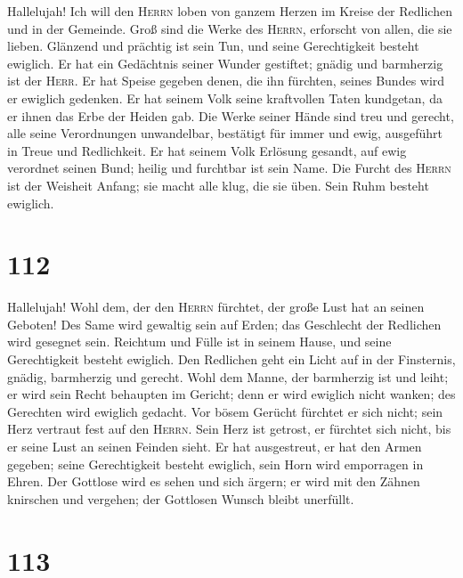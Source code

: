  Hallelujah! Ich will den \textsc{Herrn} loben von ganzem
Herzen im Kreise der Redlichen und in der Gemeinde.  Groß
sind die Werke des \textsc{Herrn}, erforscht von allen, die sie lieben.
 Glänzend und prächtig ist sein Tun, und seine
Gerechtigkeit besteht ewiglich.  Er hat ein Gedächtnis
seiner Wunder gestiftet; gnädig und barmherzig ist der \textsc{Herr}.
 Er hat Speise gegeben denen, die ihn fürchten, seines
Bundes wird er ewiglich gedenken.  Er hat seinem Volk
seine kraftvollen Taten kundgetan, da er ihnen das Erbe der Heiden gab.
 Die Werke seiner Hände sind treu und gerecht, alle seine
Verordnungen unwandelbar,  bestätigt für immer und ewig,
ausgeführt in Treue und Redlichkeit.  Er hat seinem Volk
Erlösung gesandt, auf ewig verordnet seinen Bund; heilig und furchtbar
ist sein Name.  Die Furcht des \textsc{Herrn} ist der
Weisheit Anfang; sie macht alle klug, die sie üben. Sein Ruhm besteht
ewiglich.

\hypertarget{section-111}{%
\section{112}\label{section-111}}

 Hallelujah! Wohl dem, der den \textsc{Herrn} fürchtet,
der große Lust hat an seinen Geboten!  Des Same wird
gewaltig sein auf Erden; das Geschlecht der Redlichen wird gesegnet
sein.  Reichtum und Fülle ist in seinem Hause, und seine
Gerechtigkeit besteht ewiglich.  Den Redlichen geht ein
Licht auf in der Finsternis, gnädig, barmherzig und gerecht.
 Wohl dem Manne, der barmherzig ist und leiht; er wird
sein Recht behaupten im Gericht;  denn er wird ewiglich
nicht wanken; des Gerechten wird ewiglich gedacht.  Vor
bösem Gerücht fürchtet er sich nicht; sein Herz vertraut fest auf den
\textsc{Herrn}.  Sein Herz ist getrost, er fürchtet sich
nicht, bis er seine Lust an seinen Feinden sieht.  Er hat
ausgestreut, er hat den Armen gegeben; seine Gerechtigkeit besteht
ewiglich, sein Horn wird emporragen in Ehren.  Der
Gottlose wird es sehen und sich ärgern; er wird mit den Zähnen knirschen
und vergehen; der Gottlosen Wunsch bleibt unerfüllt.

\hypertarget{section-112}{%
\section{113}\label{section-112}}

